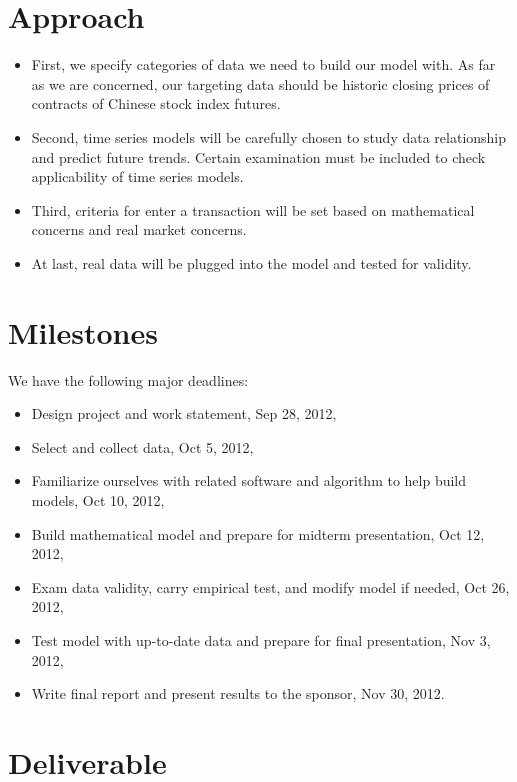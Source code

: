 \documentclass[12pt,letterpaper]{article}
\theoremstyle{definition}
\begin{document}
\section{Approach}
\begin{itemize}
    \item 	First, we specify categories of data we need to build our model with. As far as we are concerned, our targeting data should be historic closing prices of contracts of Chinese stock index futures.  
    \item 	Second, time series models will be carefully chosen to study data relationship and predict future trends. Certain examination must be included to check applicability of time series models.
    \item 	Third, criteria for enter a transaction will be set based on mathematical concerns and real market concerns.
    \item   At last, real data will be plugged into the model and tested for validity.
    
\end{itemize}
\section{Milestones}
We have the following major deadlines:
\begin{itemize}
    \item Design project and work statement, Sep 28, 2012,
    \item Select and collect data, Oct 5, 2012,
    \item Familiarize ourselves with related software and algorithm to help build models, Oct 10, 2012,
    \item Build mathematical model and prepare for midterm presentation, Oct 12, 2012,
    \item Exam data validity, carry empirical test, and modify model if needed, Oct 26, 2012,
    \item Test model with up-to-date data and prepare for final presentation, Nov 3, 2012,
    \item Write final report and present results to the sponsor, Nov 30, 2012.
\end{itemize}

\section{Deliverable}
\end{document}
